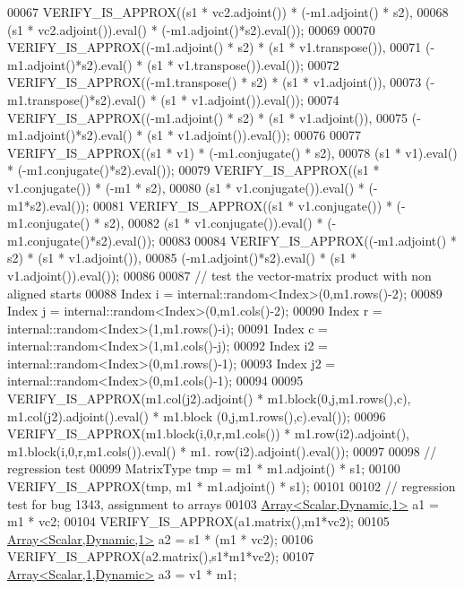 \begin{DoxyCode}
00067   VERIFY\_IS\_APPROX((s1 * vc2.adjoint()) * (-m1.adjoint() * s2),
00068                    (s1 * vc2.adjoint()).eval() * (-m1.adjoint()*s2).eval());
00069 
00070   VERIFY\_IS\_APPROX((-m1.adjoint() * s2) * (s1 * v1.transpose()),
00071                    (-m1.adjoint()*s2).eval() * (s1 * v1.transpose()).eval());
00072   VERIFY\_IS\_APPROX((-m1.transpose() * s2) * (s1 * v1.adjoint()),
00073                    (-m1.transpose()*s2).eval() * (s1 * v1.adjoint()).eval());
00074   VERIFY\_IS\_APPROX((-m1.adjoint() * s2) * (s1 * v1.adjoint()),
00075                    (-m1.adjoint()*s2).eval() * (s1 * v1.adjoint()).eval());
00076 
00077   VERIFY\_IS\_APPROX((s1 * v1) * (-m1.conjugate() * s2),
00078                    (s1 * v1).eval() * (-m1.conjugate()*s2).eval());
00079   VERIFY\_IS\_APPROX((s1 * v1.conjugate()) * (-m1 * s2),
00080                    (s1 * v1.conjugate()).eval() * (-m1*s2).eval());
00081   VERIFY\_IS\_APPROX((s1 * v1.conjugate()) * (-m1.conjugate() * s2),
00082                    (s1 * v1.conjugate()).eval() * (-m1.conjugate()*s2).eval());
00083 
00084   VERIFY\_IS\_APPROX((-m1.adjoint() * s2) * (s1 * v1.adjoint()),
00085                    (-m1.adjoint()*s2).eval() * (s1 * v1.adjoint()).eval());
00086 
00087   \textcolor{comment}{// test the vector-matrix product with non aligned starts}
00088   Index i = internal::random<Index>(0,m1.rows()-2);
00089   Index j = internal::random<Index>(0,m1.cols()-2);
00090   Index r = internal::random<Index>(1,m1.rows()-i);
00091   Index c = internal::random<Index>(1,m1.cols()-j);
00092   Index i2 = internal::random<Index>(0,m1.rows()-1);
00093   Index j2 = internal::random<Index>(0,m1.cols()-1);
00094 
00095   VERIFY\_IS\_APPROX(m1.col(j2).adjoint() * m1.block(0,j,m1.rows(),c), m1.col(j2).adjoint().eval() * m1.block
      (0,j,m1.rows(),c).eval());
00096   VERIFY\_IS\_APPROX(m1.block(i,0,r,m1.cols()) * m1.row(i2).adjoint(), m1.block(i,0,r,m1.cols()).eval() * m1.
      row(i2).adjoint().eval());
00097   
00098   \textcolor{comment}{// regression test}
00099   MatrixType tmp = m1 * m1.adjoint() * s1;
00100   VERIFY\_IS\_APPROX(tmp, m1 * m1.adjoint() * s1);
00101 
00102   \textcolor{comment}{// regression test for bug 1343, assignment to arrays}
00103   \hyperlink{group___core___module_class_eigen_1_1_array}{Array<Scalar,Dynamic,1>} a1 = m1 * vc2;
00104   VERIFY\_IS\_APPROX(a1.matrix(),m1*vc2);
00105   \hyperlink{group___core___module_class_eigen_1_1_array}{Array<Scalar,Dynamic,1>} a2 = s1 * (m1 * vc2);
00106   VERIFY\_IS\_APPROX(a2.matrix(),s1*m1*vc2);
00107   \hyperlink{group___core___module_class_eigen_1_1_array}{Array<Scalar,1,Dynamic>} a3 = v1 * m1;

\end{DoxyCode}
